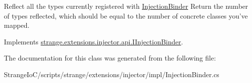 Reflect all the types currently registered with \hyperlink{classstrange_1_1extensions_1_1injector_1_1impl_1_1_injection_binder}{Injection\-Binder} Return the number of types reflected, which should be equal to the number of concrete classes you've mapped. 



Implements \hyperlink{interfacestrange_1_1extensions_1_1injector_1_1api_1_1_i_injection_binder_a4f5f1efc3286ca4358d6ca9443c0f1d2}{strange.\-extensions.\-injector.\-api.\-I\-Injection\-Binder}.



The documentation for this class was generated from the following file\-:\begin{DoxyCompactItemize}
\item 
Strange\-Io\-C/scripts/strange/extensions/injector/impl/Injection\-Binder.\-cs\end{DoxyCompactItemize}
